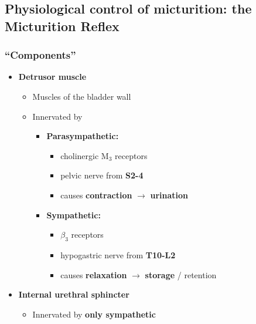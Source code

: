 \documentclass[
  12pt,
]{memoir}
\providecommand{\tightlist}{%
  \setlength{\itemsep}{0pt}\setlength{\parskip}{0pt}}
\begin{document}
\hypertarget{physiological-control-of-micturition-the-micturition-reflex}{%
\subsection{Physiological control of micturition: the Micturition
Reflex}\label{physiological-control-of-micturition-the-micturition-reflex}}

\hypertarget{components}{%
\subsubsection{``Components''}\label{components}}

\begin{itemize}
\tightlist
\item
  \textbf{Detrusor muscle}

  \begin{itemize}
  \tightlist
  \item
    Muscles of the bladder wall
  \item
    Innervated by

    \begin{itemize}
    \tightlist
    \item
      \textbf{Parasympathetic:}

      \begin{itemize}
      \tightlist
      \item
        cholinergic M\(_3\) receptors
      \item
        pelvic nerve from \textbf{S2-4}
      \item
        causes \textbf{contraction} \(\rightarrow\) \textbf{urination}
      \end{itemize}
    \item
      \textbf{Sympathetic:}

      \begin{itemize}
      \tightlist
      \item
        \(\beta_3\) receptors
      \item
        hypogastric nerve from \textbf{T10-L2}
      \item
        causes \textbf{relaxation} \(\rightarrow\) \textbf{storage} /
        retention
      \end{itemize}
    \end{itemize}
  \end{itemize}
\item
  \textbf{Internal urethral sphincter}

  \begin{itemize}
  \tightlist
  \item
    Innervated by \textbf{only sympathetic}


\end{itemize}
\end{itemize}
\end{document}
